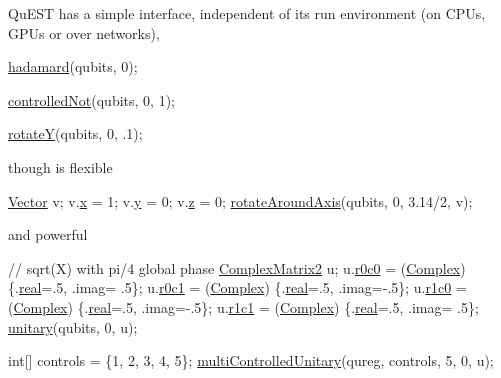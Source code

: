 Qu\+E\+ST has a simple interface, independent of its run environment (on C\+P\+Us, G\+P\+Us or over networks), 
\begin{DoxyCode}
\mbox{\hyperlink{QuEST_8h_aa09b5dd93de6df1384b8f2c0041749ab}{hadamard}}(qubits, 0);

\mbox{\hyperlink{QuEST_8h_a67576895bbc65463481a8ea24d9b1e22}{controlledNot}}(qubits, 0, 1);

\mbox{\hyperlink{QuEST_8h_ace0d3592d38a990e81a434c4e9681500}{rotateY}}(qubits, 0, .1);
\end{DoxyCode}
 though is flexible 
\begin{DoxyCode}
\mbox{\hyperlink{structVector}{Vector}} v;
v.\mbox{\hyperlink{structVector_aac7abe171ba4bada50ed72acba6259fc}{x}} = 1; v.\mbox{\hyperlink{structVector_a375ca805d4c808a53d7c4e0c737ae3de}{y}} = 0; v.\mbox{\hyperlink{structVector_ad4e863651be7d6b7e2b28cd7445a0ccf}{z}} = 0;
\mbox{\hyperlink{QuEST_8h_a8810423457803005fecd415f4299f40d}{rotateAroundAxis}}(qubits, 0, 3.14/2, v);
\end{DoxyCode}
 and powerful 
\begin{DoxyCode}
\textcolor{comment}{// sqrt(X) with pi/4 global phase}
\mbox{\hyperlink{structComplexMatrix2}{ComplexMatrix2}} u;
u.\mbox{\hyperlink{structComplexMatrix2_ae72b4458233b077a636beee1892e81ff}{r0c0}} = (\mbox{\hyperlink{QuEST_8h_ad59c9e471673c07782e6c403277ffd8d}{Complex}}) \{.\mbox{\hyperlink{structComplex_a479ad939835457595fcca3ca55c06283}{real}}=.5, .imag= .5\};
u.\mbox{\hyperlink{structComplexMatrix2_a0f3932f055a8b05cef361bce25d51172}{r0c1}} = (\mbox{\hyperlink{QuEST_8h_ad59c9e471673c07782e6c403277ffd8d}{Complex}}) \{.\mbox{\hyperlink{structComplex_a479ad939835457595fcca3ca55c06283}{real}}=.5, .imag=-.5\}; 
u.\mbox{\hyperlink{structComplexMatrix2_ab98282015ed2065e53fbc9638e2583ab}{r1c0}} = (\mbox{\hyperlink{QuEST_8h_ad59c9e471673c07782e6c403277ffd8d}{Complex}}) \{.\mbox{\hyperlink{structComplex_a479ad939835457595fcca3ca55c06283}{real}}=.5, .imag=-.5\};
u.\mbox{\hyperlink{structComplexMatrix2_a763007c3070802373549ba0350f83c8a}{r1c1}} = (\mbox{\hyperlink{QuEST_8h_ad59c9e471673c07782e6c403277ffd8d}{Complex}}) \{.\mbox{\hyperlink{structComplex_a479ad939835457595fcca3ca55c06283}{real}}=.5, .imag= .5\};
\mbox{\hyperlink{QuEST_8h_a7a0877e33700f6bad48adb51b7b3fb67}{unitary}}(qubits, 0, u);

\textcolor{keywordtype}{int}[] controls = \{1, 2, 3, 4, 5\};
\mbox{\hyperlink{QuEST_8h_ae395a79690283ed81106afadd7a8cd8a}{multiControlledUnitary}}(qureg, controls, 5, 0, u);
\end{DoxyCode}


